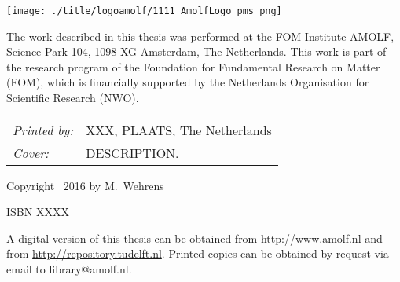 \begin{titlepage}
\texttt{[image: ./title/logoamolf/1111\_AmolfLogo\_pms\_png]}


\noindent The work described in this thesis was performed at the FOM Institute AMOLF, Science Park 104, 1098 XG Amsterdam, The Netherlands. This work is part of the research program of the Foundation for Fundamental Research on Matter (FOM), which is financially supported by the Netherlands Organisation for Scientific Research (NWO). 

\vspace{2\bigskipamount}

\noindent
\begin{tabular}{@{}p{}@{}p{}}
    \textit{Printed by:} & XXX, PLAATS, The Netherlands \\[\medskipamount]
    \textit{Cover:} & DESCRIPTION.
\end{tabular}

\vspace{2\bigskipamount} %

\noindent Copyright \textcopyright\ 2016 by M.~Wehrens



\medskip
\noindent ISBN XXXX

\medskip
\noindent A digital version of this thesis can be obtained from \url{http://www.amolf.nl} and from \url{http://repository.tudelft.nl}. Printed copies can be obtained by request via email to library@amolf.nl.


\end{titlepage}

